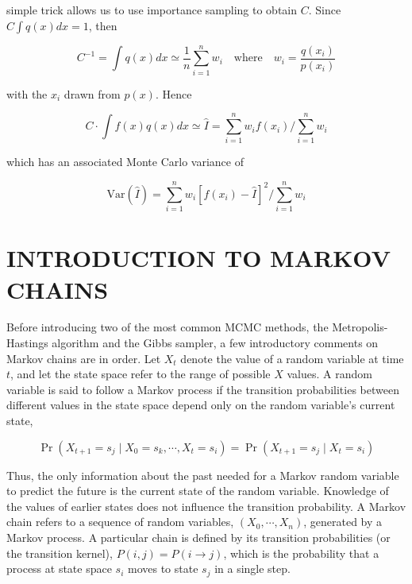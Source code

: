 \documentclass{article}
\begin{document}
simple trick allows us to use importance sampling to obtain $C$. Since $C \int q(x) dx = 1$, then

\begin{equation}
C^{-1}=\int q(x)d x\simeq\frac{1}{n}\sum_{i=1}^{n}w_{i}\quad\mathrm{w h e r e}\quad w_{i}=\frac{q(x_{i})}{p(x_{i})}
\end{equation}

with the  $ x_{i} $ drawn from  $ p(x) $. Hence

\begin{equation}
C\cdot\int f(x)q(x)dx\simeq\widehat{I}=\sum_{i=1}^{n}w_{i}f(x_{i})\bigg/\sum_{i=1}^{n}w_{i}
\end{equation}

which has an associated Monte Carlo variance of

\begin{equation}
\mathrm{Var}\left(\widehat{I}\right)=\sum_{i=1}^{n}w_{i}\left[f(x_{i})-\widehat{I}\right]^{2}\bigg/\sum_{i=1}^{n}w_{i}
\end{equation}

\section{INTRODUCTION TO MARKOV CHAINS}
Before introducing two of the most common MCMC methods, the Metropolis-Hastings algorithm and the Gibbs sampler, a few introductory comments on Markov chains are in order. Let  $ X_t $ denote the value of a random variable at time  $ t $, and let the state space refer to the range of possible  $ X $ values. A random variable is said to follow a Markov process if the transition probabilities between different values in the state space depend only on the random variable's current state,

\begin{equation}
\Pr(X_{t+1}=s_{j}\mid X_{0}=s_{k},\cdots,X_{t}=s_{i})=\Pr(X_{t+1}=s_{j}\mid X_{t}=s_{i})
\end{equation}

Thus, the only information about the past needed for a Markov random variable to predict the future is the current state of the random variable. Knowledge of the values of earlier states does not influence the transition probability. A Markov chain refers to a sequence of random variables,  $ (X_0, \cdots, X_n) $, generated by a Markov process. A particular chain is defined by its transition probabilities (or the transition kernel),  $ P(i, j) = P(i \to j) $, which is the probability that a process at state space  $ s_i $ moves to state  $ s_j $ in a single step.
\end{document}
